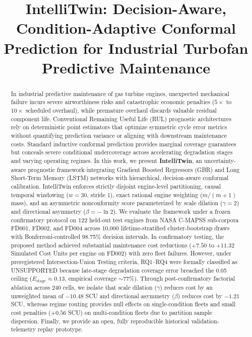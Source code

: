 \documentclass[conference,a4paper]{IEEEtran}
\begin{document}
\title{IntelliTwin: Decision-Aware, Condition-Adaptive Conformal Prediction for Industrial Turbofan Predictive Maintenance}

\author{
}

\maketitle

\begin{abstract}
In industrial predictive maintenance of gas turbine engines, unexpected mechanical failure incurs severe airworthiness risks and catastrophic economic penalties ($5\times$ to $10\times$ scheduled overhaul), while premature overhaul discards valuable residual component life. Conventional Remaining Useful Life (RUL) prognostic architectures rely on deterministic point estimators that optimize symmetric cycle error metrics without quantifying prediction variance or aligning with downstream maintenance costs. Standard inductive conformal prediction provides marginal coverage guarantees but conceals severe conditional undercoverage across accelerating degradation stages and varying operating regimes. In this work, we present \textbf{IntelliTwin}, an uncertainty-aware prognostic framework integrating Gradient Boosted Regressors (GBR) and Long Short-Term Memory (LSTM) networks with hierarchical, decision-aware conformal calibration. IntelliTwin enforces strictly disjoint engine-level partitioning, causal temporal windowing ($w=30$, stride 1), exact rational engine weighting ($m/(m+1)$ mass), and an asymmetric nonconformity score parameterized by scale dilation ($\gamma=2$) and directional asymmetry ($\beta=-\ln 2$). We evaluate the framework under a frozen confirmatory protocol on 122 held-out test engines from NASA C-MAPSS sub-corpora FD001, FD002, and FD004 across 10,000 lifetime-stratified cluster-bootstrap draws with Bonferroni-controlled 98.75\% decision intervals. In confirmatory testing, the proposed method achieved substantial maintenance cost reductions ($+7.50$ to $+11.32$ Simulated Cost Units per engine on FD002) with zero fleet failures. However, under preregistered Intersection-Union Testing criteria, RQ1--RQ4 were formally classified as UNSUPPORTED because late-stage degradation coverage error breached the 0.05 ceiling ($E_{\text{stage}} \approx 0.13$, empirical coverage $\sim 77\%$). Through post-confirmatory factorial ablation across 240 cells, we isolate that scale dilation ($\gamma$) reduces cost by an unweighted mean of $-10.48$ SCU and directional asymmetry ($\beta$) reduces cost by $-1.21$ SCU, whereas regime routing provides null effects on single-condition fleets and small cost penalties ($+0.56$ SCU) on multi-condition fleets due to partition sample dispersion. Finally, we provide an open, fully reproducible historical validation-telemetry replay prototype.
\end{abstract}
\end{document}
